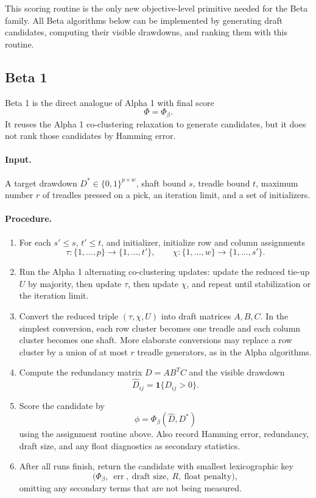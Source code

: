 \documentclass[11pt]{article}
\begin{document}
This scoring routine is the only new objective-level primitive needed for the
Beta family. All Beta algorithms below can be implemented by generating draft
candidates, computing their visible drawdowns, and ranking them with this
routine.

\subsection{Beta 1}

Beta 1 is the direct analogue of Alpha 1 with final score
\[
  \Phi=\Phi_\beta.
\]
It reuses the Alpha 1 co-clustering relaxation to generate candidates, but it
does not rank those candidates by Hamming error.

\paragraph{Input.}
A target drawdown \(D^\ast\in\{0,1\}^{p\times w}\), shaft bound \(s\), treadle
bound \(t\), maximum number \(r\) of treadles pressed on a pick, an iteration
limit, and a set of initializers.

\paragraph{Procedure.}

\begin{enumerate}[label=\textbf{B1.\arabic*.}]
  \item For each \(s'\le s\), \(t'\le t\), and initializer, initialize row and
  column assignments
  \[
    \tau:\{1,\dots,p\}\to\{1,\dots,t'\},
    \qquad
    \chi:\{1,\dots,w\}\to\{1,\dots,s'\}.
  \]

  \item Run the Alpha 1 alternating co-clustering updates: update the reduced
  tie-up \(U\) by majority, then update \(\tau\), then update \(\chi\), and
  repeat until stabilization or the iteration limit.

  \item Convert the reduced triple \((\tau,\chi,U)\) into draft matrices
  \(A,B,C\). In the simplest conversion, each row cluster becomes one treadle
  and each column cluster becomes one shaft. More elaborate conversions may
  replace a row cluster by a union of at most \(r\) treadle generators, as in
  the Alpha algorithms.

  \item Compute the redundancy matrix \(D=AB^TC\) and the visible drawdown
  \[
    \widehat{D}_{ij}=\mathbf{1}\{D_{ij}>0\}.
  \]

  \item Score the candidate by
  \[
    \phi=\Phi_\beta(\widehat{D},D^\ast)
  \]
  using the assignment routine above. Also record Hamming error, redundancy,
  draft size, and any float diagnostics as secondary statistics.

  \item After all runs finish, return the candidate with smallest lexicographic
  key
  \[
    \bigl(\Phi_\beta,\ \operatorname{err},\ \text{draft size},\ R,\ \text{float
    penalty}\bigr),
  \]
  omitting any secondary terms that are not being measured.
\end{enumerate}
\end{document}

